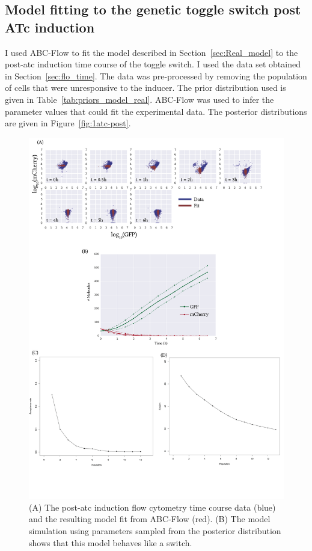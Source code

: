\subsection{Model fitting to the genetic toggle switch post ATc induction}

I used ABC-Flow to fit the model described in Section~\ref{sec:Real_model} to the post-\acrshort{atc} induction time course of the toggle switch. I used the data set obtained in Section~\ref{sec:flo_time}. The data was pre-processed by removing the population of cells that were unresponsive to the inducer. The prior distribution used is given in Table~\ref{tab:priors_model_real}. ABC-Flow was used to infer the parameter values that could fit the experimental data. The posterior distributions are given in Figure~\ref{fig:1atc-post}. 


\begin{figure}[tb]
\centerfloat
	\includegraphics[width=1.2\textwidth]{../../chapters/chapterABCFlow/images/2D_real_res-01.png}
	\caption[ABC-Flow fit to post-\acrshort{atc} time course data]{\label{fig:1d-real-res} (A) The post-\acrshort{atc} induction flow cytometry time course data (blue) and the resulting model fit from ABC-Flow (red). (B) The model simulation using parameters sampled from the posterior distribution shows that this model behaves like a switch. }
\end{figure}

